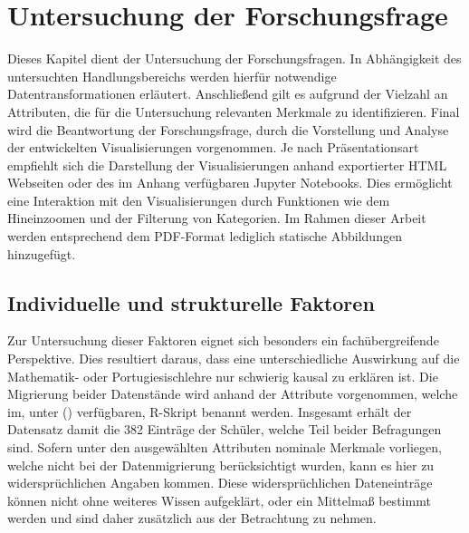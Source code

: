 \chapter[Untersuchung der Forschungsfrage]{Untersuchung der Forschungsfrage}

Dieses Kapitel dient der Untersuchung der Forschungsfragen. 
In Abhängigkeit des untersuchten Handlungsbereichs werden hierfür notwendige Datentransformationen erläutert. 
Anschließend gilt es aufgrund der Vielzahl an Attributen, die für die Untersuchung relevanten Merkmale zu identifizieren. 
Final wird die Beantwortung der Forschungsfrage, durch die Vorstellung und Analyse der entwickelten Visualisierungen vorgenommen.
Je nach Präsentationsart empfiehlt sich die Darstellung der Visualisierungen anhand exportierter HTML Webseiten oder des im Anhang verfügbaren Jupyter Notebooks.
Dies ermöglicht eine Interaktion mit den Visualisierungen durch Funktionen wie dem Hineinzoomen und der Filterung von Kategorien.
Im Rahmen dieser Arbeit werden entsprechend dem PDF-Format lediglich statische Abbildungen hinzugefügt.

\section{Individuelle und strukturelle Faktoren}

Zur Untersuchung dieser Faktoren eignet sich besonders ein fachübergreifende Perspektive. 
Dies resultiert daraus, dass eine unterschiedliche Auswirkung auf die Mathematik- oder Portugiesischlehre nur schwierig kausal zu erklären ist.
Die Migrierung beider Datenstände wird anhand der Attribute vorgenommen, welche im, unter (\cite[]{student_performance}) verfügbaren, R-Skript benannt werden.
Insgesamt erhält der Datensatz damit die 382 Einträge der Schüler, welche Teil beider Befragungen sind. 
Sofern unter den ausgewählten Attributen nominale Merkmale vorliegen, welche nicht bei der Datenmigrierung berücksichtigt wurden, kann es hier zu widersprüchlichen Angaben kommen.
Diese widersprüchlichen Dateneinträge können nicht ohne weiteres Wissen aufgeklärt, oder ein Mittelmaß bestimmt werden und sind daher zusätzlich aus der Betrachtung zu nehmen.

